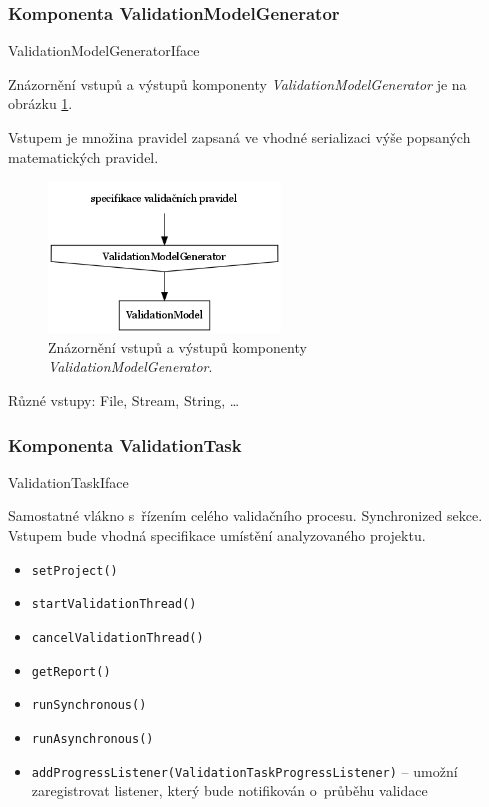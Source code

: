\subsubsection{Komponenta ValidationModelGenerator}
ValidationModelGeneratorIface

Znázornění vstupů a výstupů komponenty \emph{ValidationModelGenerator} je na obrázku \ref{design-validation_model_generator_io}.

Vstupem je množina pravidel zapsaná ve vhodné serializaci výše popsaných matematických pravidel.

\begin{figure}[h!]
  \centering
  \includegraphics[width=0.55\textwidth]{./graphs/validation_model_generator_io_graph.png}
  \caption{Znázornění vstupů a výstupů komponenty \emph{ValidationModelGenerator}.\label{design-validation_model_generator_io}}
\end{figure}

Různé vstupy: File, Stream, String, \ldots

\subsubsection{Komponenta ValidationTask}
ValidationTaskIface

Samostatné vlákno s~řízením celého validačního procesu. Synchronized sekce. Vstupem bude vhodná specifikace umístění analyzovaného projektu.

\begin{itemize}
\item \verb+setProject()+
\item \verb+startValidationThread()+
\item \verb+cancelValidationThread()+
\item \verb+getReport()+
\item \verb+runSynchronous()+
\item \verb+runAsynchronous()+
\item \verb+addProgressListener(ValidationTaskProgressListener)+ -- umožní zaregistrovat listener, který bude notifikován o~průběhu validace
\end{itemize}

